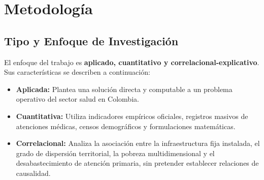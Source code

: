 \documentclass[12pt]{article}
\begin{document}
\section{Metodología}

\subsection{Tipo y Enfoque de Investigación}
El enfoque del trabajo es \textbf{aplicado, cuantitativo y correlacional-explicativo}. Sus características se describen a continuación:
\begin{itemize}
    \item \textbf{Aplicada:} Plantea una solución directa y computable a un problema operativo del sector salud en Colombia.
    \item \textbf{Cuantitativa:} Utiliza indicadores empíricos oficiales, registros masivos de atenciones médicas, censos demográficos y formulaciones matemáticas.
    \item \textbf{Correlacional:} Analiza la asociación entre la infraestructura fija instalada, el grado de dispersión territorial, la pobreza multidimensional y el desabastecimiento de atención primaria, sin pretender establecer relaciones de causalidad.
\end{itemize}
\end{document}
